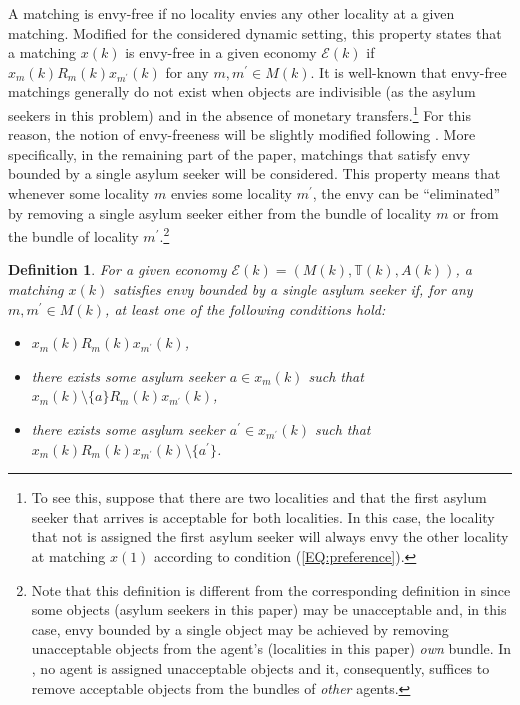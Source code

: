 \documentclass[12pt,fleqn]{article}
\newtheorem{definition}{Definition}
\begin{document}
A matching is envy-free \citep{bib:Foley} if no locality envies any other locality at a given matching. Modified for the considered dynamic setting, this property states that a matching $x(k)$ is envy-free in a given economy $\mathcal{E}(k)$ if $x_{m}(k)R_m(k) x_{m^\prime}(k)$ for any $m,m^\prime\in M(k)$. It is well-known that envy-free matchings generally do not exist when objects are indivisible (as the asylum seekers in this problem) and in the absence of monetary transfers.\footnote{To see this, suppose that there are two localities and that the first asylum seeker that arrives is acceptable for both localities. In this case, the locality that not is assigned the first asylum seeker will always envy the other locality at matching $x(1)$ according to condition (\ref{EQ:preference}).} For this reason, the notion of envy-freeness will be slightly modified following \citet{bib:Budish}. More specifically, in the remaining part of the paper, matchings that satisfy envy bounded by a single asylum seeker will be considered. This property means that whenever some locality $m$ envies some locality $m^\prime$, the envy can be ``eliminated'' by removing a single asylum seeker either from the bundle of locality $m$ or from the bundle of locality $m^\prime$.\footnote{Note that this definition is different from the corresponding definition in \citet{bib:Budish} since some objects (asylum seekers in this paper) may be unacceptable and, in this case, envy bounded by a single object may be achieved by removing unacceptable objects from the agent's (localities in this paper) \emph{own} bundle. In \citet{bib:Budish}, no agent is assigned unacceptable objects and it, consequently, suffices to remove acceptable objects from the bundles of \emph{other} agents.}
\begin{definition}\rm\label{DEF:1-Utility_DIFF}
For a given economy $\mathcal{E}(k)=(M(k),\mathbb{T}(k),A(k))$, a matching $x(k)$ satisfies envy bounded by a single asylum seeker if, for any $m,m^\prime\in M(k)$, at least one of the following conditions hold:
\begin{itemize}
\item[(i)] $x_m(k)R_m(k) x_{m^\prime}(k)$,
\item[(ii)] there exists some asylum seeker $a\in x_{m}(k)$ such that $x_m(k)\setminus\{a\}R_m(k) x_{m^\prime}(k)$,
\item[(iii)] there exists some asylum seeker $a^\prime\in x_{m^\prime}(k)$ such that $x_m(k)R_m(k) x_{m^\prime}(k)\setminus\{a^\prime\}$.
\end{itemize}
\end{definition}
\end{document}
